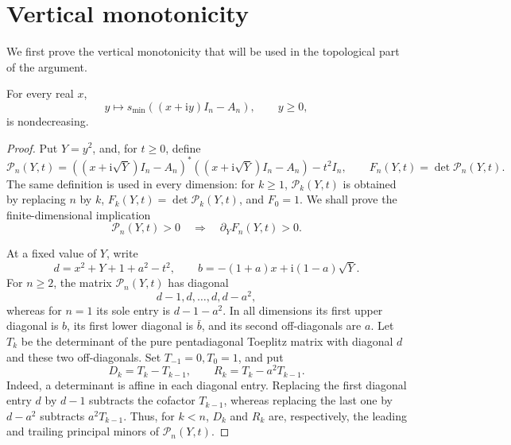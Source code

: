 \documentclass[review,hidelinks,onefignum,onetabnum]{siamart251216}
\newcommand{\ii}{\mathrm i}
\begin{document}
\section{Vertical monotonicity}\label{sec:vertical}

We first prove the vertical monotonicity that will be used in the
topological part of the argument.

\begin{lemma}\label{lem:vertical}
For every real \(x\),
\[
 y\longmapsto s_{\min}((x+\ii y)I_n-A_n),\qquad y\geq0,
\]
is nondecreasing.
\end{lemma}

\begin{proof}
Put \(Y=y^2\), and, for \(t\geq0\), define
\[
 \mathcal P_n(Y,t)=((x+\ii\sqrt Y)I_n-A_n)^*
 ((x+\ii\sqrt Y)I_n-A_n)-t^2I_n,
 \qquad F_n(Y,t)=\det \mathcal P_n(Y,t).
\]
The same definition is used in every dimension: for \(k\geq1\),
\(\mathcal P_k(Y,t)\) is obtained by replacing \(n\) by \(k\),
\(F_k(Y,t)=\det \mathcal P_k(Y,t)\), and \(F_0=1\).
We shall prove the finite-dimensional implication
\begin{equation}\label{eq:det-derivative-positive}
 \mathcal P_n(Y,t)>0\quad\Longrightarrow\quad
 \partial_YF_n(Y,t)>0.
\end{equation}

At a fixed value of \(Y\), write
\[
 d=x^2+Y+1+a^2-t^2,
 \qquad b=-(1+a)x+\ii(1-a)\sqrt Y.
\]
For \(n\geq2\), the matrix \(\mathcal P_n(Y,t)\) has diagonal
\[
 d-1,d,\ldots,d,d-a^2,
\]
whereas for \(n=1\) its sole entry is \(d-1-a^2\).  In all dimensions
its first upper diagonal is \(b\), its first lower diagonal is \(\bar b\), and its second off-diagonals are \(a\).  Let \(T_k\) be the determinant of the pure
pentadiagonal Toeplitz matrix with diagonal \(d\) and these two
off-diagonals.  Set \(T_{-1}=0,T_0=1\), and put
\begin{equation}\label{eq:D-R-def}
 D_k=T_k-T_{k-1},\qquad R_k=T_k-a^2T_{k-1}.
\end{equation}
Indeed, a determinant is affine in each diagonal entry.  Replacing the
first diagonal entry \(d\) by \(d-1\) subtracts the cofactor
\(T_{k-1}\), whereas replacing the last one by \(d-a^2\) subtracts
\(a^2T_{k-1}\).  Thus, for \(k<n\), \(D_k\) and \(R_k\) are,
respectively, the leading and trailing principal minors of
\(\mathcal P_n(Y,t)\).


\end{proof}
\end{document}
